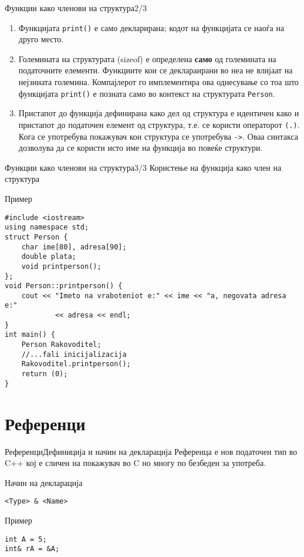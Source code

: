 \begin{frame}{Функции како членови на структура}{2/3}
\begin{enumerate}
  \item Функцијата \texttt{print()} е само декларирана; кодот на функцијата се наоѓа на друго
место.
    \item Големината на структурата (sizeof) е определена \textbf{само} од големината на
податочните елементи. Функциите кои се деклараирани во неа не влијаат на
нејзината големина. Компајлерот го имплементира ова однесување со тоа што
функцијата \texttt{print()} е позната само во контекст на структурата \texttt{Person}.
\item  Пристапот до функција дефинирана како дел од структура е идентичен како и
пристапот до податочен елемент од структура, т.е. се користи операторот \texttt{(.)}.
Кога се употребува покажувач кон структура се употребува \texttt{->}. Оваа синтакса
дозволува да се користи исто име на функција во повеќе структури.
\end{enumerate}
\end{frame}

\begin{frame}[fragile]{Функции како членови на структура}{3/3}
Користење на функција како член на структура
\begin{exampleblock}{Пример}
\begin{lstlisting}
#include <iostream>
using namespace std;
struct Person {
    char ime[80], adresa[90];
    double plata;
    void printperson();
};
void Person::printperson() {
    cout << "Imeto na vraboteniot e:" << ime << "a, negovata adresa e:"
            << adresa << endl;
}
int main() {
    Person Rakovoditel;
    //...fali inicijalizacija
    Rakovoditel.printperson();
    return (0);
}
\end{lstlisting}
\end{exampleblock}
\end{frame}

\section{Референци}

\begin{frame}[fragile]{Референци}{Дефиниција и начин на декларација}
Референца е нов податочен тип во C++ кој е сличен на покажувач во C но многу по
безбеден за употреба.
\begin{exampleblock}{Начин на декларација}
\begin{lstlisting}
<Type> & <Name>
\end{lstlisting}
\end{exampleblock}

\begin{exampleblock}{Пример}
\begin{lstlisting}
int A = 5;
int& rA = &A;
\end{lstlisting}
\end{exampleblock}
\end{frame}

